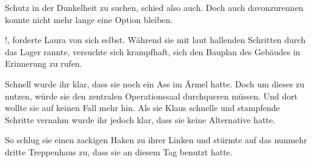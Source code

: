 \par

Schutz in der Dunkelheit zu suchen, schied also auch. Doch auch davonzurennen konnte nicht mehr lange eine Option bleiben.

\par

!, forderte Laura von sich selbst.  Während sie mit laut hallenden Schritten durch das Lager rannte, versuchte sich krampfhaft, sich den Bauplan des Gebäudes in Erinnerung zu rufen.

\par

Schnell wurde ihr klar, dass sie noch ein Ass im Ärmel hatte. Doch um dieses zu nutzen, würde sie den zentralen Operationssaal durchqueren müssen. Und dort wollte sie auf keinen Fall mehr hin. Als sie Klaus schnelle und stampfende Schritte vernahm wurde ihr jedoch klar, dass sie keine Alternative hatte.

\par

So schlug sie einen zackigen Haken zu ihrer Linken und stürmte auf das nunmehr dritte Treppenhaus zu, dass sie an diesem Tag benutzt hatte.
